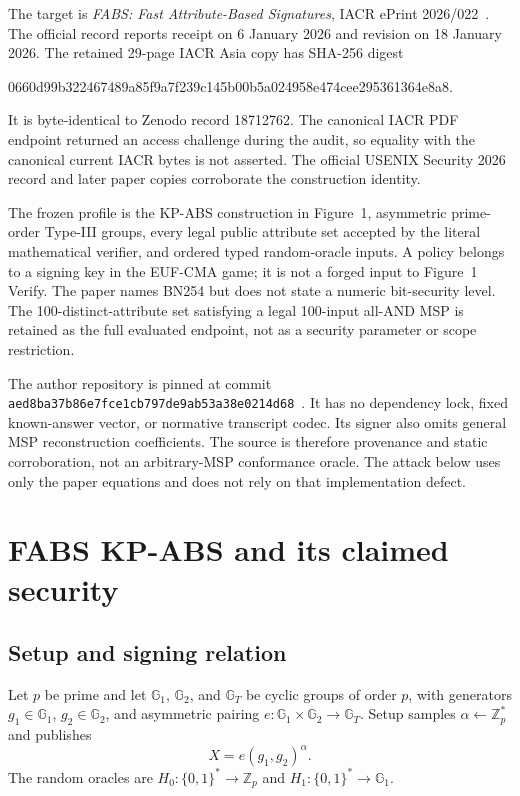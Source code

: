 \documentclass[10pt,a4paper]{article}
\newcommand{\Zp}{\mathbb{Z}_p}
\newcommand{\gone}{\mathbb{G}_1}
\newcommand{\gtwo}{\mathbb{G}_2}
\newcommand{\gthree}{\mathbb{G}_T}
\begin{document}
The target is \emph{FABS: Fast Attribute-Based Signatures}, IACR ePrint
2026/022~\cite{fabs}. The official record reports receipt on 6 January 2026
and revision on 18 January 2026. The retained 29-page IACR Asia copy has
SHA-256 digest
\begin{center}
\small\ttfamily
0660d99b322467489a85f9a7f239c145b00b5a024958e474cee295361364e8a8.
\end{center}
It is byte-identical to Zenodo record 18712762. The canonical IACR PDF endpoint
returned an access challenge during the audit, so equality with the canonical
current IACR bytes is not asserted. The official USENIX Security 2026 record
and later paper copies corroborate the construction identity.

The frozen profile is the KP-ABS construction in Figure~1, asymmetric
prime-order Type-III groups, every legal public attribute set accepted by the
literal mathematical verifier, and ordered typed random-oracle inputs. A
policy belongs to a signing key in the EUF-CMA game; it is not a forged input
to Figure~1 Verify. The paper names BN254 but does not state a numeric
bit-security level. The 100-distinct-attribute set satisfying a legal
100-input all-AND MSP is retained as the full evaluated endpoint, not as a
security parameter or scope restriction.

The author repository is pinned at commit
\texttt{aed8ba37b86e7fce1cb797de9ab53a38e0214d68}~\cite{fabssource}.
It has no dependency lock, fixed known-answer vector, or normative transcript
codec. Its signer also omits general MSP reconstruction coefficients. The
source is therefore provenance and static corroboration, not an arbitrary-MSP
conformance oracle. The attack below uses only the paper equations and does
not rely on that implementation defect.

\section{FABS KP-ABS and its claimed security}

\subsection{Setup and signing relation}

Let $p$ be prime and let $\gone$, $\gtwo$, and $\gthree$ be cyclic groups of
order $p$, with generators $g_1\in\gone$, $g_2\in\gtwo$, and asymmetric
pairing $e:\gone\times\gtwo\rightarrow\gthree$. Setup samples
$\alpha\leftarrow\Zp^*$ and publishes
\[
 X=e(g_1,g_2)^\alpha.
\]
The random oracles are $H_0:\{0,1\}^*\rightarrow\Zp$ and
$H_1:\{0,1\}^*\rightarrow\gone$.
\end{document}

